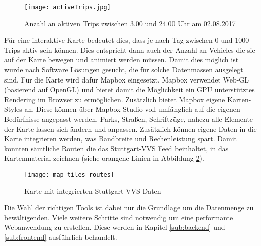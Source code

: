 \begin{newpage}
      \begin{figure}[htbp]
        \begin{center}
          \texttt{[image: activeTrips.jpg]}
          \caption{Anzahl an aktiven Trips zwischen 3.00 und 24.00 Uhr am 02.08.2017}
          \label{fig:activeTrips}
        \end{center}
      \end{figure}

      Für eine interaktive Karte bedeutet dies, dass je nach Tag zwischen 0 und 1000 Trips aktiv sein können. Dies entspricht dann auch der Anzahl an Vehicles die sie auf der Karte bewegen und animiert werden müssen. Damit dies möglich ist wurde nach Software Lösungen gesucht, die für solche Datenmassen ausgelegt sind. Für die Karte wird dafür Mapbox eingesetzt. Mapbox verwendet Web-GL (basierend auf OpenGL) und bietet damit die Möglichkeit ein GPU unterstütztes Rendering im Browser zu ermöglichen. Zusätzlich bietet Mapbox eigene Karten-Styles an. Diese können über Mapbox-Studio voll umfänglich auf die eigenen Bedürfnisse angepasst werden. Parks, Straßen, Schriftzüge, nahezu alle Elemente der Karte lassen sich ändern und anpassen. Zusätzlich können eigene Daten in die Karte integrieren werden, was Bandbreite und Rechenleistung spart. Damit konnten sämtliche Routen die das Stuttgart-VVS Feed beinhaltet, in das Kartenmaterial zeichnen (siehe orangene Linien in Abbildung \ref{fig:map_tiles_routes}).\\

      \begin{figure}[htbp]
        \begin{center}
          \texttt{[image: map\_tiles\_routes]}
          \caption{Karte mit integrierten Stuttgart-VVS Daten}
          \label{fig:map_tiles_routes}
        \end{center}
      \end{figure}
      
      Die Wahl der richtigen Tools ist dabei nur die Grundlage um die Datenmenge zu bewältigenden. Viele weitere Schritte sind notwendig um eine performante Webanwendung zu erstellen. Diese werden in Kapitel \ref{sub:backend}  und \ref{sub:frontend}  ausführlich behandelt.
        
\end{newpage}
